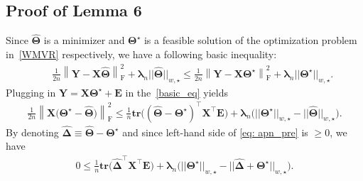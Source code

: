 \documentclass[alpha-refs]{wiley-article}
\begin{document}
\subsection{Proof of Lemma 6}
Since $\widehat{\boldsymbol{\Theta}}$ is a minimizer and $\boldsymbol{\Theta^{\star}}$ is a feasible solution of the optimization problem in~\eqref{WMVR} respectively, we have a following basic inequality:
\begin{eqnarray} \label{basic_eq}
    & & \frac{1}{2n} \left\| \boldsymbol{Y}-\boldsymbol{X}\boldsymbol{\widehat{\Theta}} \right\|_{\text{F}}^{2} + \boldsymbol{\lambda}_{n}||\widehat{\boldsymbol{\Theta}}||_{w,\star} \leq \frac{1}{2n}\left\| \boldsymbol{Y}-\boldsymbol{X}\boldsymbol{\Theta^{\star}} \right\|_{\text{F}}^{2} + \boldsymbol{\lambda}_{n}||\boldsymbol{\Theta^{\star}}||_{w,\star}.
\end{eqnarray}
Plugging in $\boldsymbol{Y}=\boldsymbol{X}\boldsymbol{\Theta^{\star}}+\boldsymbol{E}$ in the~\eqref{basic_eq} yields
\begin{align}
    \frac{1}{2n} \left\| \boldsymbol{X} \big(\boldsymbol{\Theta^{\star}}-\boldsymbol{\widehat{\Theta}}\big) \right\|_{\text{F}}^{2} \leq \frac{1}{n} \textbf{tr}\big( ( \boldsymbol{\widehat{\Theta}} - \boldsymbol{\Theta^{\star}})^{\top} \boldsymbol{X}^{\top}\boldsymbol{E} \big) +
    \boldsymbol{\lambda}_{n} \big( ||\boldsymbol{\Theta^{\star}}||_{w,\star} - ||\widehat{\boldsymbol{\Theta}}||_{w,\star} \big). \label{eq: apn_pre}
\end{align}
By denoting $\boldsymbol{\widehat{\Delta}} \equiv \widehat{\boldsymbol{\Theta}} - \boldsymbol{\Theta^{\star}} $ and since left-hand side of \eqref{eq: apn_pre} is $\geq 0$, we have
\begin{eqnarray}
    0 \leq \frac{1}{n} \textbf{tr}\big( \boldsymbol{\widehat{\Delta}}^{\top} \boldsymbol{X}^{\top}\boldsymbol{E} \big) + \boldsymbol{\lambda}_{n}\big( ||\boldsymbol{\Theta^{\star}}||_{w,\star} - ||\boldsymbol{\widehat{\Delta}} + \boldsymbol{\Theta^{\star}}||_{w,\star} \big).  \label{eq: apn_main}
\end{eqnarray}
\end{document}
